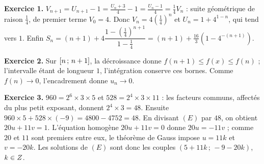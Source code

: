 \begin{corrige}
\textbf{Exercice 1.} $V_{n+1} = U_{n+1}-1 = \frac{U_{n}+3}{4}-1 = \frac{U_{n}-1}{4}
= \frac14V_{n}$ : suite géométrique de raison $\frac14$, de premier terme
$V_{0} = 4$. Donc $V_{n} = 4\left(\frac14\right)^{n}$ et
$U_{n} = 1+4^{1-n}$, qui tend vers $1$. Enfin
$S_{n} = (n+1)+4\dfrac{1-\left(\frac14\right)^{n+1}}{1-\frac14}
= (n+1)+\frac{16}{3}\left(1-4^{-(n+1)}\right)$.

\textbf{Exercice 2.} Sur $\left[n\,;\,n+1\right]$, la décroissance donne
$f(n+1) \leq f(x) \leq f(n)$ ; l'intervalle étant de longueur $1$,
l'intégration conserve ces bornes. Comme $f(n) \to 0$, l'encadrement donne
$u_{n} \to 0$.

\textbf{Exercice 3.} $960 = 2^{6}\times3\times5$ et $528 = 2^{4}\times3\times11$ : les
facteurs communs, affectés du plus petit exposant, donnent
$2^{4}\times3 = 48$. Ensuite $960\times5+528\times(-9) = 4800-4752 = 48$. En
divisant $(E)$ par $48$, on obtient $20u+11v = 1$. L'équation homogène
$20u+11v = 0$ donne $20u = -11v$ ; comme $20$ et $11$ sont premiers entre eux,
le théorème de Gauss impose $u = 11k$ et $v = -20k$. Les solutions de $(E)$
sont donc les couples $(5+11k\,;\,-9-20k)$, $k \in Z$.

\end{corrige}
